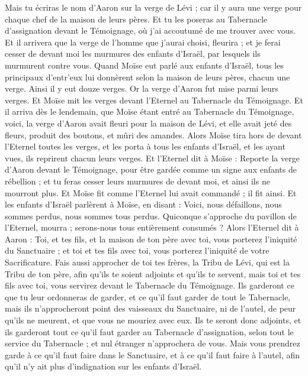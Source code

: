 \begin{multicols}{2}
Mais tu écriras le nom d'Aaron sur la verge de Lévi ; car il y aura une verge pour chaque chef de la maison de leurs pères.
Et tu les poseras au Tabernacle d'assignation devant le Témoignage, où j'ai accoutumé de me trouver avec vous.
Et il arrivera que la verge de l'homme que j'aurai choisi, fleurira ; et je ferai cesser de devant moi les murmures des enfants d'Israël, par lesquels ils murmurent contre vous.
Quand Moïse eut parlé aux enfants d'Israël, tous les principaux d'entr'eux lui donnèrent selon la maison de leurs pères, chacun une verge. Ainsi il y eut douze verges. Or la verge d'Aaron fut mise parmi leurs verges.
Et Moïse mit les verges devant l'Eternel au Tabernacle du Témoignage.
Et il arriva dès le lendemain, que Moïse étant entré au Tabernacle du Témoignage, voici, la verge d'Aaron avait fleuri pour la maison de Lévi, et elle avait jeté des fleurs, produit des boutons, et mûri des amandes.
Alors Moïse tira hors de devant l'Eternel toutes les verges, et les porta à tous les enfants d'Israël, et les ayant vues, ils reprirent chacun leurs verges.
Et l'Eternel dit à Moïse : Reporte la verge d'Aaron devant le Témoignage, pour être gardée comme un signe aux enfants de rébellion ; et tu feras cesser leurs murmures de devant moi, et ainsi ils ne mourront plus.
Et Moïse fit comme l'Eternel lui avait commandé ; il fit ainsi.
Et les enfants d'Israël parlèrent à Moïse, en disant : Voici, nous défaillons, nous sommes perdus, nous sommes tous perdus.
Quiconque s'approche du pavillon de l'Eternel, mourra ; serons-nous tous entièrement consumés ?
\VerseOne{}Alors l'Eternel dit à Aaron : Toi, et tes fils, et la maison de ton père avec toi, vous porterez l'iniquité du Sanctuaire ; et toi et tes fils avec toi, vous porterez l'iniquité de votre Sacrificature.
Fais aussi approcher de toi tes frères, la Tribu de Lévi, qui est la Tribu de ton père, afin qu'ils te soient adjoints et qu'ils te servent, mais toi et tes fils avec toi, vous servirez devant le Tabernacle du Témoignage.
Ils garderont ce que tu leur ordonneras de garder, et ce qu'il faut garder de tout le Tabernacle, mais ils n'approcheront point des vaisseaux du Sanctuaire, ni de l'autel, de peur qu'ils ne meurent, et que vous ne mouriez avec eux.
Ils te seront donc adjoints, et ils garderont tout ce qu'il faut garder au Tabernacle d'assignation, selon tout le service du Tabernacle ; et nul étranger n'approchera de vous.
Mais vous prendrez garde à ce qu'il faut faire dans le Sanctuaire, et à ce qu'il faut faire à l'autel, afin qu'il n'y ait plus d'indignation sur les enfants d'Israël.

\end{multicols}

